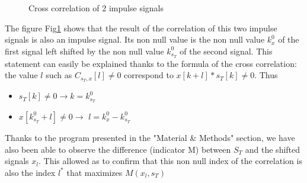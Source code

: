 \documentclass[a4paper]{article}
\begin{document}
    
\begin{figure}[!htb]\centering
    \begin{minipage}{0.49\textwidth}  \end{minipage}
    \caption{Cross correlation of 2 impulse signals}
    \label{correlationOnImpulse.png}
\end{figure}
The figure Fig\ref{correlationOnImpulse.png} shows that the result of the correlation of this two impulse signals is also an impulse signal.   Its non null value is the non null value $k_{x}^{0}$ of the first signal left shifted by the non null value $k_{s_{T}}^{0}$ of the second signal.   This statement can easily be explained thanks to the formula of the cross correlation: the value $l$ such as $C_{s_{T}, x}[l] \neq 0$ correspond to $x[k+l]*s_{T}[k] \neq 0$.   Thus 
\begin{itemize}
	\item $s_{T}[k] \neq 0 \rightarrow k = k_{s_{T}}^{0}$
    \item $x[k_{s_{T}}^{0}+l] \neq 0 \rightarrow$ $l = k_{x}^{0} - k_{s_{T}}^{0}$
\end{itemize}

Thanks to the program presented in the "Material \& Methods" section, we have also been able to observe the difference (indicator M) between $S_{T}$ and the shifted signals $x_{l}$.   This allowed as to confirm that this non null index of the correlation is also the index $l^*$ that maximizes $M(x_{l}, s_{T})$
    
    
\end{document}
